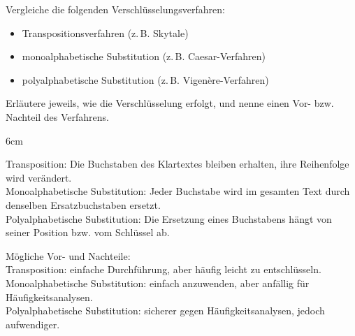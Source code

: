 \question[6]
Vergleiche die folgenden Verschlüsselungsverfahren:

\begin{itemize}
\item Transpositionsverfahren (z.\,B. Skytale)
\item monoalphabetische Substitution (z.\,B. Caesar-Verfahren)
\item polyalphabetische Substitution (z.\,B. Vigenère-Verfahren)
\end{itemize}

Erläutere jeweils, wie die Verschlüsselung erfolgt, und nenne einen Vor- bzw. Nachteil des Verfahrens.

\begin{solutionbox}{6cm}

Transposition: Die Buchstaben des Klartextes bleiben erhalten, ihre Reihenfolge wird verändert. \\
Monoalphabetische Substitution: Jeder Buchstabe wird im gesamten Text durch denselben Ersatzbuchstaben ersetzt. \\
Polyalphabetische Substitution: Die Ersetzung eines Buchstabens hängt von seiner Position bzw. vom Schlüssel ab.  

Mögliche Vor- und Nachteile: \\
Transposition: einfache Durchführung, aber häufig leicht zu entschlüsseln. \\
Monoalphabetische Substitution: einfach anzuwenden, aber anfällig für Häufigkeitsanalysen. \\
Polyalphabetische Substitution: sicherer gegen Häufigkeitsanalysen, jedoch aufwendiger.
\end{solutionbox}